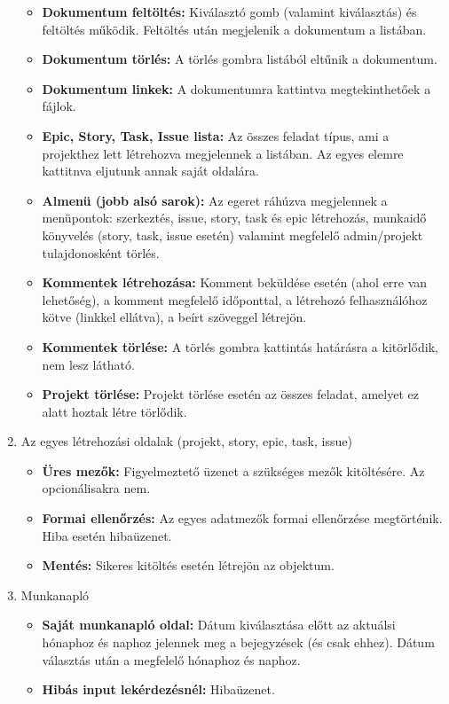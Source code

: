 \begin{enumerate}
\begin{itemize}
		\item \textbf{Dokumentum feltöltés:} Kiválasztó gomb (valamint kiválasztás) és feltöltés működik. Feltöltés után megjelenik a dokumentum a listában.
		\item \textbf{Dokumentum törlés:} A törlés gombra listából eltűnik a dokumentum.
		\item \textbf{Dokumentum linkek:} A dokumentumra kattintva megtekinthetőek a fájlok.
		\item \textbf{Epic, Story, Task, Issue lista:} Az összes feladat típus, ami a projekthez lett létrehozva megjelennek a listában. Az egyes elemre kattitnva eljutunk annak saját oldalára.
		\item \textbf{Almenü (jobb alsó sarok):} Az egeret ráhúzva megjelennek a menüpontok: szerkeztés, issue, story, task és epic létrehozás, munkaidő könyvelés (story, task, issue esetén) valamint megfelelő admin/projekt tulajdonosként törlés.
		\item \textbf{Kommentek létrehozása:} Komment beküldése esetén (ahol erre van lehetőség), a komment megfelelő időponttal, a létrehozó felhasználóhoz kötve (linkkel ellátva), a beírt szöveggel létrejön.
		\item \textbf{Kommentek törlése:} A törlés gombra kattintás határásra a kitörlődik, nem lesz látható.
		\item \textbf{Projekt törlése:} Projekt törlése esetén az összes feladat, amelyet ez alatt hoztak létre törlődik.
	\end{itemize} 
	\item Az egyes létrehozási oldalak (projekt, story, epic, task, issue)
	\begin{itemize}
		\item \textbf{Üres mezők:} Figyelmeztető üzenet a szükséges mezők kitöltésére. Az opcionálisakra nem.
		\item \textbf{Formai ellenőrzés:} Az egyes adatmezők formai ellenőrzése megtörténik. Hiba esetén hibaüzenet.
		\item \textbf{Mentés:} Sikeres kitöltés esetén létrejön az objektum.
	\end{itemize}
	\item Munkanapló
	\begin{itemize}
		\item \textbf{Saját munkanapló oldal:} Dátum kiválasztása előtt az aktuálsi hónaphoz és naphoz jelennek meg a bejegyzések (és csak ehhez). Dátum választás után a megfelelő hónaphoz és naphoz.
		\item \textbf{Hibás input lekérdezésnél:}  Hibaüzenet.

\end{itemize}
\end{enumerate}
